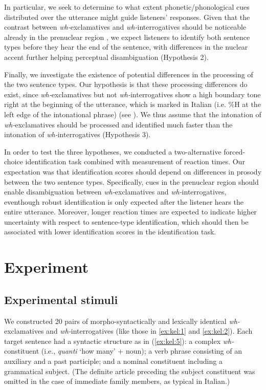 \documentclass[output=paper]{langsci/langscibook}
\begin{document}
In particular, we seek to determine to what extent phonetic/phonological cues distributed over the utterance might guide listeners' responses. Given that the contrast between \textit{wh-}exclamatives and \textit{wh-}interrogatives should be noticeable already in the prenuclear region \citep{Sorianello2011exclamative}, we expect listeners to identify both sentence types before they hear the end of the sentence, with differences in the nuclear accent further helping perceptual disambiguation (Hypothesis 2).

Finally, we investigate the existence of potential differences in the processing of the two sentence types. Our hypothesis is that these processing differences do exist, since \textit{wh-}exclamatives but not \textit{wh-}interrogatives show a high boundary tone right at the beginning of the utterance, which is marked in Italian (i.e. \%H at the left edge of the intonational phrase) (see \citealt{Sorianello2011exclamative}). We thus assume that the intonation of \textit{wh-}exclamatives should be processed and identified much faster than the intonation of \textit{wh-}interrogatives (Hypothesis 3).

In order to test the three hypotheses, we conducted a two-alternative forced-choice identification task combined with measurement of reaction times. Our expectation was that identification scores should depend on differences in prosody between the two sentence types. Specifically, cues in the prenuclear region should enable disambiguation between \textit{wh-}exclamatives and \textit{wh-}interrogatives, even\linebreak though robust identification is only expected after the listener hears the entire utterance. Moreover, longer reaction times are expected to indicate higher uncertainty with respect to sentence-type identification, which should then be associated with lower identification scores in the identification task.



\section{Experiment}
\label{sec:kel:4}

\subsection{Experimental stimuli} 
\label{sec:kel:4.1}

We constructed 20 pairs of morpho-syntactically and lexically identical \textit{wh-}ex\-cla\-ma\-tives and \textit{wh-}in\-ter\-ro\-ga\-tives (like those in \ref{ex:kel:1} and \ref{ex:kel:2}). Each target sentence had a syntactic structure as in (\ref{ex:kel:5}): a complex \textit{wh-}constituent (i.e., \textit{quanti} ‘how many’ + noun); a verb phrase consisting of an auxiliary and a past participle; and a nominal constituent including a grammatical subject. (The definite article preceding the subject constituent was omitted in the case of immediate family members, as typical in Italian.)
\end{document}
